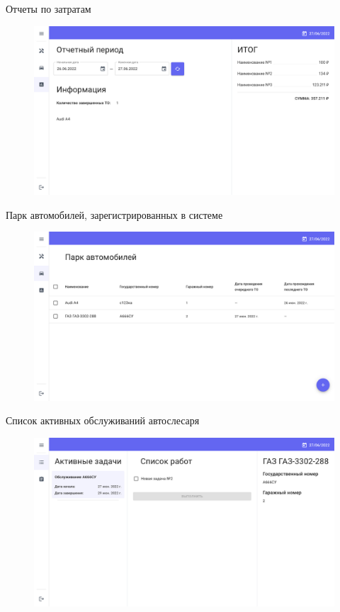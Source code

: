 \documentclass{beamer}
\begin{document}
\begin{frame}
	{Отчеты по затратам}
    \begin{figure}[H]
        \centering
        \includegraphics[keepaspectratio,width=\textwidth]{presentation/images/tech.plumpalbert.xyz.report.png}
    \end{figure}
\end{frame}
\begin{frame}
	{Парк автомобилей, зарегистрированных в системе}
    \begin{figure}[H]
        \centering
        \includegraphics[keepaspectratio,width=\textwidth]{presentation/images/tech.plumpalbert.xyz.autos.png}
    \end{figure}
\end{frame}
\begin{frame}
	{Список активных обслуживаний автослесаря}
    \begin{figure}[H]
        \centering
        \includegraphics[keepaspectratio,width=\textwidth]{presentation/images/tech.plumpalbert.xyz.tasks.png}
    \end{figure}
\end{frame}
\end{document}
